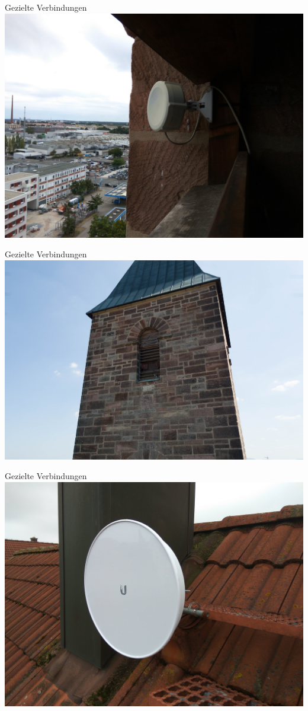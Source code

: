 \documentclass{beamer}
\begin{document}
	\begin{frame}[standout]{Gezielte Verbindungen}
		\includegraphics[height=0.9\textheight]{media/p2p-sxt.jpg}
	\end{frame}
	\begin{frame}[standout]{Gezielte Verbindungen}
		\includegraphics[width=\framewidth]{media/p2p-stmarkus.jpg}
	\end{frame}
	\begin{frame}[standout]{Gezielte Verbindungen}
		\includegraphics[height=0.9\textheight]{media/p2p-wohnhaus.jpg}
	\end{frame}
\end{document}
